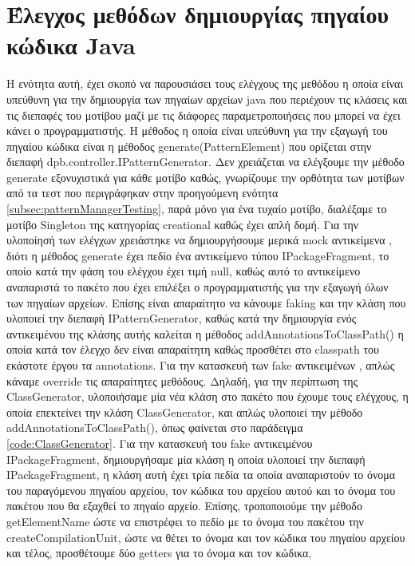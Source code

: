 \section{Έλεγχος μεθόδων δημιουργίας πηγαίου κώδικα Java}
\label{sec:patternGeneratorTesting}
Η ενότητα αυτή, έχει σκοπό να παρουσιάσει τους ελέγχους της μεθόδου η οποία είναι υπεύθυνη 
για την δημιουργία των πηγαίων αρχείων java που περιέχουν τις κλάσεις και τις διεπαφές του μοτίβου μαζί με τις 
διάφορες παραμετροποιήσεις που μπορεί να έχει κάνει ο προγραμματιστής. Η μέθοδος η οποία είναι υπεύθυνη για την εξαγωγή 
του πηγαίου κώδικα είναι η μέθοδος generate(PatternElement) που ορίζεται στην διεπαφή dpb.controller.IPatternGenerator. 
Δεν χρειάζεται να ελέγξουμε την μέθοδο generate εξονυχιστικά για κάθε μοτίβο καθώς, γνωρίζουμε την ορθότητα των μοτίβων από τα τεστ που 
περιγράφηκαν στην προηγούμενη ενότητα \ref{subsec:patternManagerTesting}, παρά μόνο για ένα τυχαίο μοτίβο, 
διαλέξαμε το μοτίβο Singleton της κατηγορίας creational καθώς έχει απλή δομή. Για την υλοποίησή των ελέγχων χρειάστηκε να δημιουργήσουμε
μερικά mock αντικείμενα \cite{SWEBOK}, διότι η μέθοδος generate έχει πεδίο ένα αντικείμενο τύπου IPackageFragment, 
το οποίο κατά την φάση του ελέγχου έχει τιμή null, καθώς αυτό το αντικείμενο αναπαριστά το πακέτο που έχει επιλέξει ο προγραμματιστής 
για την εξαγωγή όλων των πηγαίων αρχείων. Επίσης είναι απαραίτητο να κάνουμε faking \cite{SWEBOK} και την κλάση που υλοποιεί
την διεπαφή IPatternGenerator, καθώς κατά την δημιουργία ενός αντικειμένου της κλάσης αυτής καλείται 
η μέθοδος addAnnotationsToClassPath() η οποία κατά τον έλεγχο δεν είναι απαραίτητη καθώς προσθέτει στο classpath του εκάστοτε έργου 
τα annotations. Για την κατασκευή των fake αντικειμένων \cite{SWEBOK}, απλώς κάναμε override τις απαραίτητες μεθόδους.
Δηλαδή, για την περίπτωση της ClassGenerator, υλοποιήσαμε μία νέα κλάση στο πακέτο που έχουμε τους ελέγχους, 
η οποία επεκτείνει την κλάση ClassGenerator, και απλώς υλοποιεί την μέθοδο addAnnotationsToClassPath(), όπως φαίνεται στο παράδειγμα 
\ref{code:ClassGenerator}. Για την κατασκευή του fake αντικειμένου \cite{SWEBOK} IPackageFragment, 
δημιουργήσαμε μία κλάση η οποία υλοποιεί την διεπαφή IPackageFragment, η κλάση αυτή έχει τρία πεδία τα οποία αναπαριστούν 
το όνομα του παραγόμενου πηγαίου αρχείου, τον κώδικα του αρχείου αυτού και το όνομα του πακέτου που θα εξαχθεί το πηγαίο αρχείο. 
Επίσης, τροποποιούμε την μέθοδο getElementName ώστε να επιστρέφει το πεδίο με το όνομα του πακέτου την createCompilationUnit, 
ώστε να θέτει το όνομα και τον κώδικα του πηγαίου αρχείου και τέλος, προσθέτουμε δύο getters για το όνομα και τον κώδικα, 
